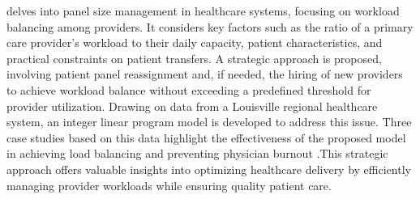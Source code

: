 \documentclass[11pt]{article}
\theoremstyle{definition}
\begin{document}
\cite{Harrington2021} delves into panel size management in healthcare systems, focusing on workload balancing among providers. It considers key factors such as the ratio of a primary care provider's workload to their daily capacity, patient characteristics, and practical constraints on patient transfers. A strategic approach is proposed, involving patient panel reassignment and, if needed, the hiring of new providers to achieve workload balance without exceeding a predefined threshold for provider utilization. Drawing on data from a Louisville regional healthcare system, an integer linear program model is developed to address this issue. Three case studies based on this data highlight the effectiveness of the proposed model in achieving load balancing and preventing physician burnout \cite{Harrington2021}.This strategic approach offers valuable insights into optimizing healthcare delivery by efficiently managing provider workloads while ensuring quality patient care.\\
\end{document}
